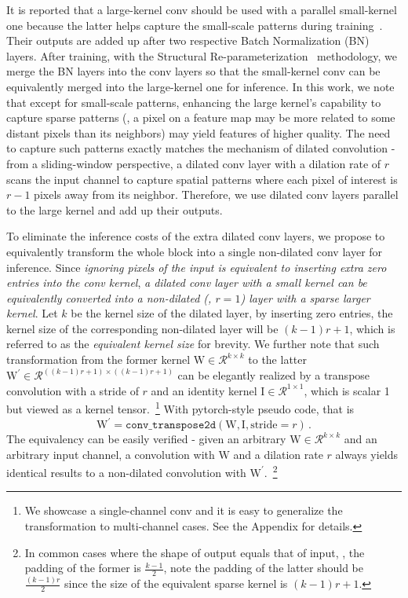 \documentclass[10pt,twocolumn,letterpaper]{article}
\begin{document}
It is reported that a large-kernel conv should be used with a parallel small-kernel one because the latter helps capture the small-scale patterns during training~\cite{ding2022scaling}. Their outputs are added up after two respective Batch Normalization (BN)~\cite{ioffe2015batch} layers. After training, with the Structural Re-parameterization~\cite{ding2021repvgg} methodology, we merge the BN layers into the conv layers so that the small-kernel conv can be equivalently merged into the large-kernel one for inference. In this work, we note that except for small-scale patterns, enhancing the large kernel's capability to capture sparse patterns (\ie, a pixel on a feature map may be more related to some distant pixels than its neighbors) may yield features of higher quality. The need to capture such patterns exactly matches the mechanism of dilated convolution - from a sliding-window perspective, a dilated conv layer with a dilation rate of $r$ scans the input channel to capture spatial patterns where each pixel of interest is $r-1$ pixels away from its neighbor. Therefore, we use dilated conv layers parallel to the large kernel and add up their outputs.


To eliminate the inference costs of the extra dilated conv layers, we propose to equivalently transform the whole block into a single non-dilated conv layer for inference. Since \emph{ignoring pixels of the input is equivalent to inserting extra zero entries into the conv kernel}, \emph{a dilated conv layer with a small kernel can be equivalently converted into a non-dilated (\ie, $r=1$) layer with a sparse larger kernel}. Let $k$ be the kernel size of the dilated layer, by inserting zero entries, the kernel size of the corresponding non-dilated layer will be $(k-1)r+1$, which is referred to as the \emph{equivalent kernel size} for brevity. We further note that such transformation from the former kernel $\mathrm{W}\in\mathcal{R}^{k\times k}$ to the latter $\mathrm{W}^\prime\in\mathcal{R}^{((k-1)r+1)\times ((k-1)r+1)}$ can be elegantly realized by a transpose convolution with a stride of $r$ and an identity kernel $\mathrm{I}\in\mathcal{R}^{1\times1}$, which is scalar 1 but viewed as a kernel tensor.~\footnote{We showcase a single-channel conv and it is easy to generalize the transformation to multi-channel cases. See the Appendix for details.} With pytorch-style pseudo code, that is
\begin{equation}\label{eq-merge}
    \mathrm{W}^\prime = \mathtt{conv\_transpose2d}(\mathrm{W}, \mathrm{I}, \text{stride}=r) \,.
\end{equation}
The equivalency can be easily verified - given an arbitrary $\mathrm{W}\in\mathcal{R}^{k\times k}$ and an arbitrary input channel, a convolution with $\mathrm{W}$ and a dilation rate $r$ always yields identical results to a non-dilated convolution with $\mathrm{W}^\prime$.~\footnote{In common cases where the shape of output equals that of input, \ie, the padding of the former is $\frac{k-1}{2}$, note the padding of the latter should be $\frac{(k-1)r}{2}$ since the size of the equivalent sparse kernel is $(k-1)r+1$.}
\end{document}
